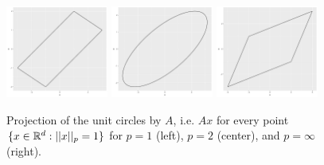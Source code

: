 \documentclass{article}
\begin{document}
\begin{figure}[ht]
    \centering
    \includegraphics[width=0.3\textwidth]{A_unit_circle_1.pdf}
    \includegraphics[width=0.3\textwidth]{A_unit_circle_2.pdf}
    \includegraphics[width=0.3\textwidth]{A_unit_circle_inf.pdf}
    \caption{Projection of the unit circles by $A$, i.e. $Ax$ for every point $\{x \in \mathbb{R}^d: ||x||_p = 1\}$ for $p = 1$ (left), $p = 2$ (center), and $p = \infty$ (right).}
    \label{fig:output}
\end{figure}
\end{document}
